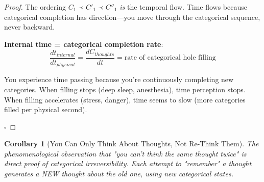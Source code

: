 \documentclass[11pt,a4paper]{article}
\newtheorem{corollary}[theorem]{Corollary}
\begin{document}
\begin{proof}
The ordering $C_1 \prec C'_1 \prec C''_1$ \textit{is} the temporal flow. Time flows because categorical completion has direction—you move through the categorical sequence, never backward.

\textbf{Internal time = categorical completion rate}:
\begin{equation}
\frac{dt_{internal}}{dt_{physical}} = \frac{dC_{thoughts}}{dt} = \text{rate of categorical hole filling}
\end{equation}

You experience time passing because you're continuously completing new categories. When filling stops (deep sleep, anesthesia), time perception stops. When filling accelerates (stress, danger), time seems to slow (more categories filled per physical second).

$\square$
\end{proof}

\begin{corollary}[You Can Only Think About Thoughts, Not Re-Think Them]
\label{cor:no_rethinking}
The phenomenological observation that "you can't think the same thought twice" is direct proof of categorical irreversibility. Each attempt to "remember" a thought generates a NEW thought about the old one, using new categorical states.
\end{corollary}
\end{document}
